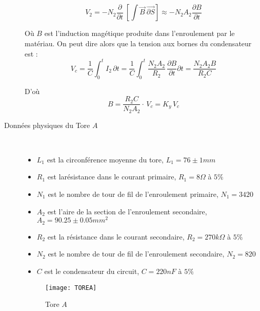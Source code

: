 \documentclass{article}
\begin{document}
\begin{description}
\begin{equation}
V_2 = -N_2 \frac{\partial}{\partial t}\ \left[ \int \vec{B}\ \vec{\partial S}\right]
\approx -N_2A_2\frac{\partial B}{\partial t}
\end{equation}

Où $B$ est l'induction magétique produite dans l'enroulement par le matériau. On peut dire alors que la tension aux bornes du condensateur est :\\

\begin{equation*}
V_c = \frac{1}{C} \int_0^t\! I_2\, \partial t = \frac{1}{C} \int_0^t\! \frac{N_2A_2}{R_2}\, \frac{\partial B}{\partial t} \partial t = \frac{N_2A_2B}{R_2C}
\end{equation*}

D'où\\

\begin{equation}
B = \frac{R_2C}{N_2A_2} \cdot\, V_c = K_y\, V_c
\end{equation}

\pagebreak

\item[Données physiques du Tore $A$]\hfill\\
\begin{itemize}
\item $L_1$ est la circonférence moyenne du tore, $L_1 = 76\pm 1 mm$
\item $R_1$ est larésistance dans le courant primaire, $R_1 = 8\Omega$ à $ 5\%$
\item $N_1$ est le nombre de tour de fil de l'enroulement primaire, $N_1 = 3420$
\item $A_2$ est l'aire de la section de l'enroulement secondaire, $A_2 = 90.25\pm 0.05mm^{2}$
\item $R_2$ est la résistance dans le courant secondaire, $R_2 = 270k\Omega$ à $5\%$
\item $N_2$ est le nombre de tour de fil de l'enroulement secondaire, $N_2 = 820$
\item $C$ est le condensateur du circuit, $C = 220nF$ à $5\%$ 
\end{itemize}


\begin{figure}[h!]
\begin{center}
\texttt{[image: TOREA]}
\caption{Tore $A$}
\label{fig:montage3}
\end{center}
\end{figure}



\end{description}
\end{document}
